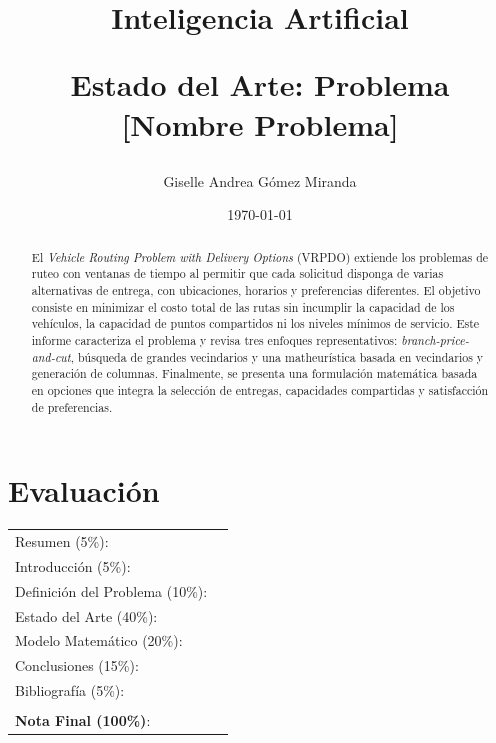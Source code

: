\documentclass[letter, 10pt]{article}
\begin{document}
\title{Inteligencia Artificial \\ \begin{Large}Estado del Arte: Problema [Nombre Problema]\end{Large}}
\author{Giselle Andrea Gómez Miranda}
\date{\today}
\maketitle


\section*{Evaluaci\'on}

\begin{tabular}{ll}
Resumen (5\%): & \underline{\hspace{2cm}} \\
Introducci\'on (5\%):  & \underline{\hspace{2cm}} \\
Definici\'on del Problema (10\%):  & \underline{\hspace{2cm}} \\
Estado del Arte (40\%):  & \underline{\hspace{2cm}} \\
Modelo Matem\'atico (20\%): &  \underline{\hspace{2cm}}\\
Conclusiones (15\%): &  \underline{\hspace{2cm}}\\
Bibliograf\'ia (5\%): & \underline{\hspace{2cm}}\\
 &  \\
\textbf{Nota Final (100\%)}:   & \underline{\hspace{2cm}}
\end{tabular}
\vspace{2cm}


\begin{abstract}

El \emph{Vehicle Routing Problem with Delivery Options} (VRPDO) extiende los problemas de ruteo con ventanas de tiempo al permitir que cada solicitud disponga de varias alternativas de entrega, con ubicaciones, horarios y preferencias diferentes. El objetivo consiste en minimizar el costo total de las rutas sin incumplir la capacidad de los vehículos, la capacidad de puntos compartidos ni los niveles mínimos de servicio. Este informe caracteriza el problema y revisa tres enfoques representativos: \emph{branch-price-and-cut}, búsqueda de grandes vecindarios y una matheurística basada en vecindarios y generación de columnas. Finalmente, se presenta una formulación matemática basada en opciones que integra la selección de entregas, capacidades compartidas y satisfacción de preferencias. \end{abstract}
\end{document}
